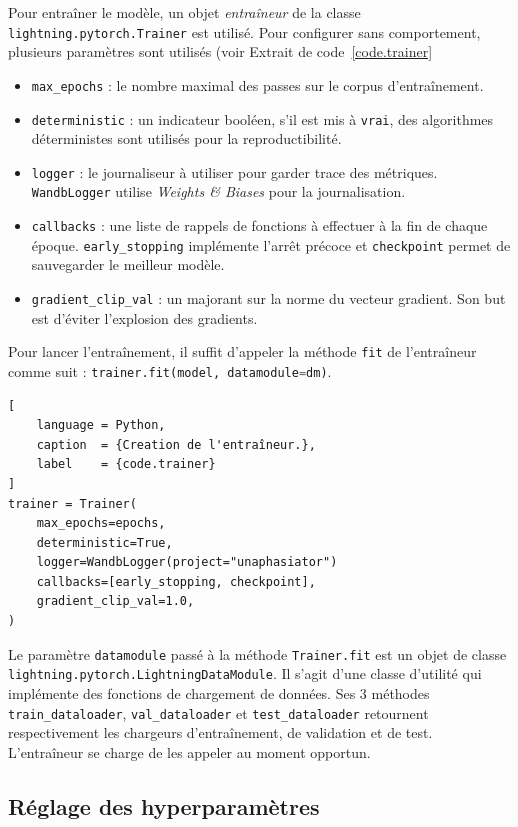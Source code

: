 Pour entraîner le modèle,
un objet \emph{entraîneur} de la classe \verb|lightning.pytorch.Trainer| est utilisé.
Pour configurer sans comportement, plusieurs paramètres sont utilisés (voir Extrait de code~\ref{code.trainer}
\begin{itemize}
    \item \verb|max_epochs| : le nombre maximal des passes sur le corpus d'entraînement.
    \item \verb|deterministic| : un indicateur booléen, s'il est mis à \verb|vrai|, 
    des algorithmes déterministes sont utilisés pour la reproductibilité.
    \item \verb|logger| : le journaliseur à utiliser pour garder trace des métriques.
    \verb|WandbLogger| utilise \emph{\foreignlanguage{english}{Weights \& Biases}} pour la journalisation.
    \item \verb|callbacks| : une liste de rappels de fonctions à effectuer à la fin de chaque époque.
    \verb|early_stopping| implémente l'arrêt précoce et \verb|checkpoint| permet de sauvegarder le meilleur modèle.
    \item \verb|gradient_clip_val| : un majorant sur la norme du vecteur gradient.
    Son but est d'éviter l'explosion des gradients.
\end{itemize}
Pour lancer l'entraînement, il suffit d'appeler la méthode \verb|fit| de l'entraîneur comme suit :
\lstinline[language=Python]|trainer.fit(model, datamodule=dm)|.

\begin{lstlisting}[
    language = Python,
    caption  = {Creation de l'entraîneur.},
    label    = {code.trainer}
]
trainer = Trainer(
    max_epochs=epochs,
    deterministic=True,
    logger=WandbLogger(project="unaphasiator")
    callbacks=[early_stopping, checkpoint],
    gradient_clip_val=1.0,
)
\end{lstlisting}

Le paramètre \verb|datamodule| passé à la méthode \verb|Trainer.fit| est un objet de classe
\verb|lightning.pytorch.LightningDataModule|.
Il s'agit d'une classe d'utilité qui implémente des fonctions de chargement de données.
Ses 3 méthodes \verb|train_dataloader|, \verb|val_dataloader| et \verb|test_dataloader|
retournent respectivement les chargeurs d'entraînement, de validation et de test.
L'entraîneur se charge de les appeler au moment opportun.

\subsection{Réglage des hyperparamètres}%
\label{subsec.hparam-tuning}

